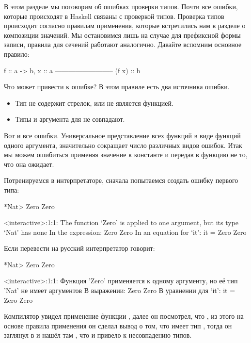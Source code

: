 В этом разделе мы поговорим об ошибках проверки типов. 
Почти все ошибки, которые происходят в Haskell связаны с 
проверкой типов. Проверка типов происходит согласно правилам
применения, которые встретились нам в разделе о композиции 
значений. 
Мы остановимся лишь на случае для префиксной формы записи, 
правила для сечений работают аналогично. 
Давайте вспомним основное правило:

\begin{code}
                    f :: a -> b,       x :: a
                    --------------------------
                            (f x) :: b
\end{code}

Что может привести к ошибке? В этом правиле есть
два источника ошибки. 

\begin{itemize}
\item Тип  не содержит стрелок, или  не является функцией. 
\item Типы  и аргумента для  не совпадают.
\end{itemize}

Вот и все ошибки. Универсальное представление всех функций 
в виде функций одного аргумента, значительно сокращает число
различных видов ошибок. Итак мы можем ошибиться применяя
значение к константе и передав в функцию не то, что она
ожидает.

Потренируемся в интерпретаторе, сначала попытаемся
создать ошибку первого типа:

\begin{code}
*Nat> Zero Zero

<interactive>:1:1:
    The function `Zero' is applied to one argument,
    but its type `Nat' has none
    In the expression: Zero Zero
    In an equation for `it': it = Zero Zero
\end{code}

Если перевести на русский интерпретатор говорит: 

\begin{code}
*Nat> Zero Zero

<interactive>:1:1:
    Функция 'Zero' применяется к одному аргументу,
    но её тип 'Nat' не имеет аргументов
    В выражении: Zero Zero
    В уравнении для `it': it = Zero Zero
\end{code}

Компилятор увидел применение функции , далее он 
посмотрел, что , из этого на основе правила применения
он сделал вывод о том, что  имеет тип ,
тогда он заглянул в  и нашёл там , что
и привело к несовпадению типов. 

